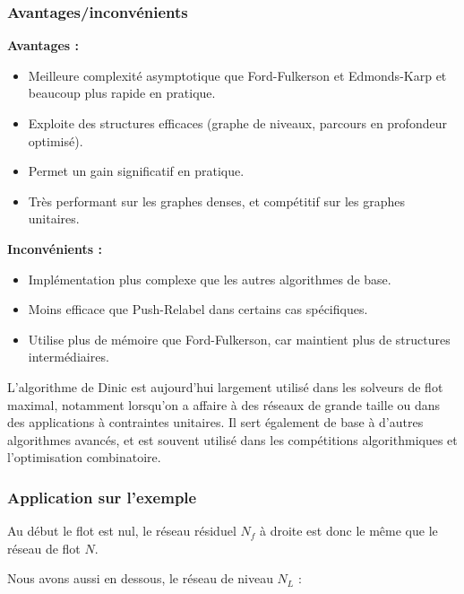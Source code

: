 \documentclass[a4paper]{article}
\begin{document}
\subsubsection{Avantages/inconvénients}
\textbf{Avantages :}
\begin{itemize}
    \item Meilleure complexité asymptotique que Ford-Fulkerson et Edmonds-Karp et beaucoup plus rapide en pratique.
    \item Exploite des structures efficaces (graphe de niveaux, parcours en profondeur optimisé).
    \item Permet un gain significatif en pratique.
    \item Très performant sur les graphes denses, et compétitif sur les graphes unitaires.
\end{itemize}

\textbf{Inconvénients :}
\begin{itemize}
    \item Implémentation plus complexe que les autres algorithmes de base.
    \item Moins efficace que Push-Relabel dans certains cas spécifiques.
    \item Utilise plus de mémoire que Ford-Fulkerson, car maintient plus de structures intermédiaires.
\end{itemize}
L’algorithme de Dinic est aujourd’hui largement utilisé dans les solveurs de flot maximal, notamment lorsqu’on a affaire à des réseaux de grande taille ou dans des applications à contraintes unitaires. Il sert également de base à d’autres algorithmes avancés, et est souvent utilisé dans les compétitions algorithmiques et l’optimisation combinatoire\cite{article}.
\subsubsection{Application sur l'exemple}
Au début le flot est nul, le réseau résiduel $N_f$ à droite est donc le même que le réseau de flot $N$.

Nous avons aussi en dessous, le réseau de niveau $N_L$ :
\end{document}
